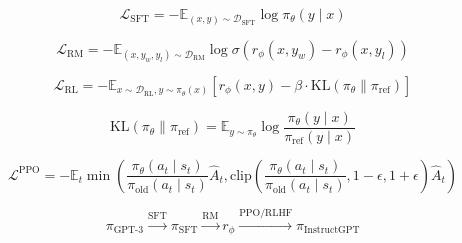 
\begin{equation}
\mathcal{L}_{\text{SFT}} = -\mathbb{E}_{(x, y) \sim \mathcal{D}_{\text{SFT}}} \log \pi_{\theta}(y \mid x)
\end{equation}

\begin{equation}
\mathcal{L}_{\text{RM}} = -\mathbb{E}_{(x, y_w, y_l) \sim \mathcal{D}_{\text{RM}}}
\log \sigma\left( r_{\phi}(x, y_w) - r_{\phi}(x, y_l) \right)
\end{equation}

\begin{equation}
\mathcal{L}_{\text{RL}} = -\mathbb{E}_{x \sim \mathcal{D}_{\text{RL}}, y \sim \pi_{\theta}(x)}
\left[ r_{\phi}(x, y) - \beta \cdot \text{KL}\left( \pi_{\theta} \parallel \pi_{\text{ref}} \right) \right]
\end{equation}

\begin{equation}
\text{KL}\left( \pi_{\theta} \parallel \pi_{\text{ref}} \right) =
\mathbb{E}_{y \sim \pi_{\theta}} \log \frac{\pi_{\theta}(y \mid x)}{\pi_{\text{ref}}(y \mid x)}
\end{equation}

\begin{equation}
\mathcal{L}^{\text{PPO}} = -\mathbb{E}_{t} \min\left(
\frac{\pi_{\theta}(a_t \mid s_t)}{\pi_{\text{old}}(a_t \mid s_t)} \hat{A}_t,
\text{clip}\left( \frac{\pi_{\theta}(a_t \mid s_t)}{\pi_{\text{old}}(a_t \mid s_t)}, 1-\epsilon, 1+\epsilon \right) \hat{A}_t
\right)
\end{equation}

\begin{equation}
\pi_{\text{GPT-3}} \xrightarrow{\text{SFT}} \pi_{\text{SFT}} \xrightarrow{\text{RM}} r_{\phi} \xrightarrow{\text{PPO/RLHF}} \pi_{\text{InstructGPT}}
\end{equation}